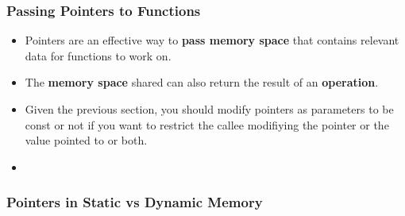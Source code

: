 \documentclass[10pt]{article}
\begin{document}
\subsubsection{Passing Pointers to Functions}
\begin{itemize}
	\item Pointers are an effective way to \textbf{pass memory space} that contains relevant data for functions to work on.

	\item The \textbf{memory space} shared can also return the result of an \textbf{operation}.
	\item Given the previous section, you should modify pointers as parameters to be const or not if you want to restrict the callee modifiying the pointer or the value pointed to or both.

	\item {}
\end{itemize}

\newpage

\subsubsection{Pointers in Static vs Dynamic Memory}
\end{document}
